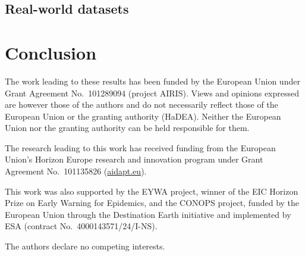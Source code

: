 \documentclass{article}
\theoremstyle{plain}
\theoremstyle{definition}
\theoremstyle{remark}
\begin{document}
\vspace{-0.5em}
\subsection{Real-world datasets}
\label{sec:real-datasets}


\vspace{-0.5em}
\section{Conclusion}\label{sec:conclusion}
\label{sec:limitations}


\begin{ack}
The work leading to these results has been funded by the European Union under Grant Agreement No.~101289094 (project AIRIS). Views and opinions expressed are however those of the authors and do not necessarily reflect those of the European Union or the granting authority (HaDEA). Neither the European Union nor the granting authority can be held responsible for them.

The research leading to this work has received funding from the European Union's Horizon Europe research and innovation program under Grant Agreement No.~101135826 (\href{https://aidapt.eu}{aidapt.eu}).

This work was also supported by the EYWA project, winner of the EIC Horizon Prize on Early Warning for Epidemics, and the CONOPS project, funded by the European Union through the Destination Earth initiative and implemented by ESA (contract No.~4000143571/24/I-NS).

The authors declare no competing interests.
\end{ack}




\clearpage
\appendix


\clearpage

\end{document}
